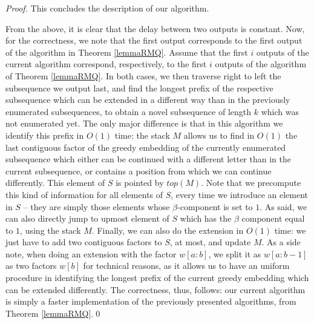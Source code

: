 \documentclass[runningheads,UKenglish,cleveref, autoref, thm-restate]{llncs}
\begin{document}
\begin{proof}
This concludes the description of our algorithm. 

From the above, it is clear that the delay between two outputs is constant. Now, for the correctness, we note that the first output corresponds to the first output of the algorithm in Theorem \ref{lemmaRMQ}. Assume that the first $i$ outputs of the current algorithm correspond, respectively, to the first $i$ outputs of the algorithm of Theorem \ref{lemmaRMQ}. In both cases, we then traverse right to left the subsequence we output last, and find the longest prefix of the respective subsequence which can be extended in a different way than in the previously enumerated subsequences, to obtain a novel subsequence of length $k$ which was not enumerated yet. The only major difference is that in this algorithm we identify this prefix in $O(1)$ time: the stack $M$ allows us to find in $O(1)$ the last contiguous factor of the greedy embedding of the currently enumerated subsequence which either can be continued with a different letter than in the current subsequence, or contains a position from which we can continue differently. This element of $S$ is pointed by $top(M)$. Note that we precompute this kind of information for all elements of $S$, every time we introduce an element in $S$ -- they are simply those elements whose $\beta$-component is set to $1$. As said, we can also directly jump to upmost element of $S$ which has the $\beta$ component equal to $1$, using the stack $M$. Finally, we can also do the extension in $O(1)$ time: we just have to add two contiguous factors to $S$, at most, and update $M$. As a side note, when doing an extension with the factor $w[a:b]$, we split it as $w[a:b-1]$ as two factors $w[b]$ for technical reasons, as it allows us to have an uniform procedure in identifying the longest prefix of the current greedy embedding which can be extended differently. The correctness, thus, follows: our current algorithm is simply a faster implementation of the previously presented algorithms, from Theorem \ref{lemmaRMQ}.\qed
 \end{proof}


	
\end{document}
